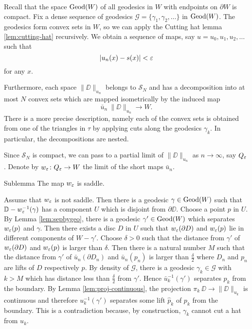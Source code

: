 \documentclass[a4paper,10pt]{amsart}
\begin{document}
Recall that the space $\mathop{\rm Geod}\nolimits(W)$ of all geodesics in $W$ with endpoints on $\partial W$ is compact. 
Fix a dense sequence of geodesics $\mathcal{G}=\{\gamma_1,\gamma_2,\ldots\}$ in $\mathop{\rm Geod}\nolimits(W)$.
The geodesics form convex sets in $W$, so we can apply the Cutting hat lemma \ref{lem:cutting-hat}
recursively.
We obtain a sequence of maps, say $u=u_0,u_1,u_2,\ldots$ such that 
\[|u_n(x)-s(x)|<\varepsilon\]
for any $x$.




Furthermore, each space $\|\DD\|_{u_n}$
belongs to $\mathcal{S}_N$ and has a decomposition into at most $N$ convex sets which are mapped isometrically by 
the induced map 
\[\bar u_n\:\|\DD\|_{u_n}\to W.\] 
There is a more precise description, namely each of the convex sets is 
obtained from one of the triangles in $\tau$ by applying cuts along the geodesics $\gamma_k$. In particular, the decompositions
are nested.

Since $\mathcal{S}_N$ is compact, we can pass to a partial limit of $\|\DD\|_{u_n}$ as $n\to\infty$,
say $Q_\varepsilon$.
Denote by $w_\varepsilon\colon Q_\varepsilon\to W$ the limit of the short maps $\bar u_n$.

\begin{thm}{Sublemma}
 The map $w_\varepsilon$ is saddle.
\end{thm}

Assume that $w_\varepsilon$ is not saddle. Then there is a geodesic $\gamma\in\mathop{\rm Geod}\nolimits(W)$ such that $\mathbb{D}-w_\varepsilon^{-1}(\gamma)$
has a component $U$ which is disjoint from $\partial \DD$. Choose a point $p$ in $U$. By Lemma \ref{lem:sepbygeo}, there is  
a geodesic $\gamma'\in\mathop{\rm Geod}\nolimits(W)$ which separates $w_\varepsilon(p)$ and $\gamma$.
Then there exists a disc $D$ in $U$ such that
$w_\varepsilon(\partial D)$ and $w_\varepsilon(p)$ lie in different components of $W-\gamma'$. Choose $\delta>0$ 
such that the distance from $\gamma'$ of $w_\varepsilon(\partial D)$ and $w_\varepsilon(p)$ is larger than $\delta$.
Then there is a natural number $M$ such that the distance from $\gamma'$ of $\bar u_n(\partial D_n)$ and $\bar u_n(p_n)$ is larger than $\frac{\delta}{2}$
where $D_n$ and $p_n$ are lifts of $D$ respectively $p$.
By density of $\mathcal{G}$, there is a geodesic $\gamma_k\in \mathcal{G}$ with $k>M$ which has distance less than $\frac{\delta}{2}$ from $\gamma'$. 
Hence $\bar u_k^{-1}(\gamma')$ separates $p_k$ from the boundary. By Lemma \ref{lem:proj-continuous}, the projection $\pi_k\:\DD\to \|\DD\|_{u_k}$ is continuous
and therefore $u_k^{-1}(\gamma')$ separates some lift $\hat p_k$ of $p_k$ from the boundary.
This is a contradiction because, by construction, $\gamma_k$ cannot cut a hat from $u_k$.
\qeds
\end{document}
